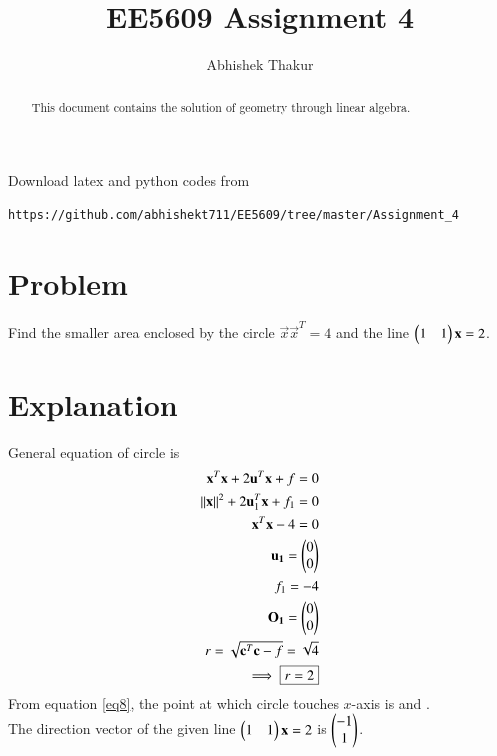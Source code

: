 \documentclass[journal,12pt,twocolumn]{IEEEtran}
\begin{document}
     \def\rightbox#1{\makebox[0in][r]{#1}}
     \def\centbox#1{\makebox[0in]{#1}}
     \def\topbox#1{\raisebox{-\baselineskip}[0in][0in]{#1}}
     \def\midbox#1{\raisebox{-0.5\baselineskip}[0in][0in]{#1}}
\vspace{3cm}
\title{EE5609 Assignment 4}
\author{Abhishek Thakur}
\maketitle
\newpage
\bigskip
\renewcommand{\thefigure}{\theenumi}
\renewcommand{\thetable}{\theenumi}
\begin{abstract}
This document contains the solution of geometry through linear algebra.
\end{abstract}
Download latex and python codes from 
\begin{lstlisting}
https://github.com/abhishekt711/EE5609/tree/master/Assignment_4
\end{lstlisting}
%
\section{Problem}
Find the smaller area enclosed by the circle  $\vec{x}\vec{x}^T=4$ and the line $\begin{pmatrix}1 & 1\end{pmatrix} \mathbf{x}=2$.
\section{Explanation}
General equation of circle is 
\begin{align}
{\mathbf{x}^T\mathbf{x}} + 2\mathbf{u}^T\mathbf{x} + f = 0 \label{eq1}\\
 \left\lVert\mathbf{x}\right\rVert^2 + 2\mathbf{u}_1^T\mathbf{x} + f_1 = 0\label{eq2}\\
 {\mathbf{x}^{T}\mathbf{x}}-4=0 \label{eq3}\\
 \mathbf{u_1}=\begin{pmatrix}0\\0\end{pmatrix}\label{eq4}\\
 f_1=-4\label{eq5}\\
\mathbf{O_1}=\begin{pmatrix}0\\0\end{pmatrix}\label{eq6}\\
r=\sqrt{\mathbf{c}^{T}\mathbf{c}-f} = \sqrt{4}\label{eq7}\\
    \implies \boxed{r=2} \label{eq8}
 \end{align}
From equation \eqref{eq8}, the point at which circle touches $x$-axis is  and .\\
The direction vector of the given line $\begin{pmatrix}1&1\end{pmatrix}\mathbf{x}=2$ is $\begin{pmatrix}-1\\1\end{pmatrix}$.\\
\end{document}
